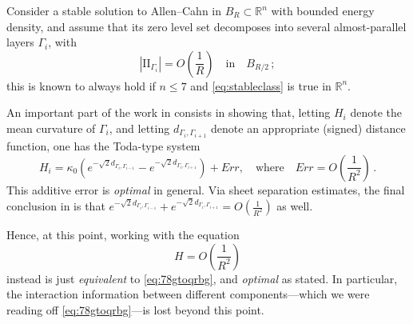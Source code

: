 \documentclass{article}
\newcommand{\R}{\mathbb{R}}
\theoremstyle{definition}
\begin{document}
Consider a stable solution to Allen--Cahn in $B_R\subset\R^n$ with bounded energy density, and assume that its zero level set decomposes into several almost-parallel layers $\Gamma_i$, with
\begin{equation}\label{eq:2738ytgbog}
    |\mathrm{II}_{\Gamma_i}|=O(\frac{1}{R})\quad\mbox{in}\quad B_{R/2}\,;
\end{equation}
this is known to always hold if $n\leq 7$ and \eqref{eq:stableclass} is true in $\R^n$.

An important part of the work in \cite{WW19} consists in showing that, letting $H_i$ denote the mean curvature of $\Gamma_i$, and letting $d_{\Gamma_i,\Gamma_{i+1}}$ denote an appropriate (signed) distance function, one has the Toda-type system
\begin{equation}\label{eq:78gtoqrbg}
    H_i=\kappa_0 \left(e^{-\sqrt{2}d_{\Gamma_i,\Gamma_{i-1}}} - e^{-\sqrt{2}d_{\Gamma_i,\Gamma_{i+1}}}\right)+Err,\quad\mbox{where}\quad Err=O(\frac{1}{R^2})\,.
\end{equation}
This additive error is \textit{optimal} in general. Via sheet separation estimates, the final conclusion in \cite{WW19} is that $e^{-\sqrt{2}d_{\Gamma_i,\Gamma_{i-1}}}+e^{-\sqrt{2}d_{\Gamma_i,\Gamma_{i+1}}}=O(\frac{1}{R^2})$ as well.

Hence, at this point, working with the equation 
\begin{equation}\label{eq:78gtoqrbg2}
    H=O(\frac{1}{R^2})
\end{equation}
instead is just {\it equivalent} to \eqref{eq:78gtoqrbg}, and {\it optimal} as stated. In particular, the interaction information between different components---which we were reading off \eqref{eq:78gtoqrbg}---is lost beyond this point.\\
\end{document}

